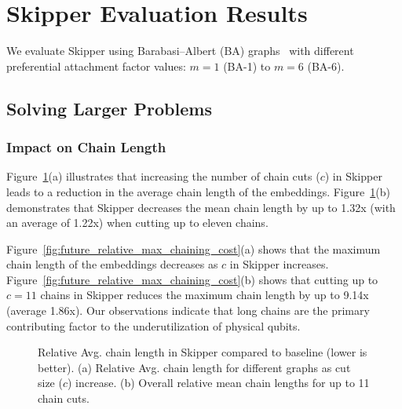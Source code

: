 \newpage
\section{Skipper Evaluation Results}
We evaluate Skipper using Barabasi--Albert (BA) graphs~\cite{barabasi1999emergence} 
with different preferential attachment factor values: $m=1$ (BA-1) to $m=6$ (BA-6). 


\subsection{Solving Larger Problems}

\subsubsection{Impact on Chain Length}

Figure~\ref{fig:future_relative_avg_chaining_cost}(a) illustrates that increasing the number of chain cuts ($c$) in Skipper leads to a reduction in the average chain length of the embeddings.
Figure~\ref{fig:future_relative_avg_chaining_cost}(b) demonstrates that Skipper decreases the mean chain length by up to 1.32x (with an average of 1.22x) when cutting up to eleven chains.

Figure~\ref{fig:future_relative_max_chaining_cost}(a) shows that the maximum chain length of the embeddings decreases as $c$ in Skipper increases.
Figure~\ref{fig:future_relative_max_chaining_cost}(b) shows that cutting up to $c=11$ chains in Skipper reduces the maximum chain length by up to 9.14x (average 1.86x).
Our observations indicate that long chains are the primary contributing factor to the underutilization of physical qubits.

\begin{figure}[h]
    \captionsetup[subfigure]{position=top} %
    \centering
    \caption{        
        Relative Avg. chain length in Skipper compared to baseline (lower is better). 
        (a) Relative Avg. chain length for different graphs as cut size ($c$) increase. 
        (b) Overall relative mean chain lengths for up to 11 chain cuts. 
}    
    \label{fig:future_relative_avg_chaining_cost} 
\end{figure}  


